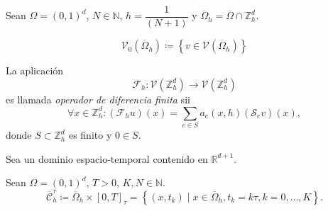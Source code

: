 \begin{definition}
	Sean
	\begin{math}
		\Omega=
		{\left(0,1\right)}^{d}
	\end{math},
	\begin{math}
		N\in\mathbb{N}
	\end{math},
	\begin{math}
		h=
		\dfrac{1}{\left(N+1\right)}
	\end{math}
	y
	\begin{math}
		\overline{\Omega}_{h}=
		\overline{\Omega}\cap
		\mathbb{Z}^{d}_{h}
	\end{math}.

	\begin{equation*}
		\mathcal{V}_{0}\left(\overline{\Omega}_{h}\right)\coloneqq
		\left\{
		v\in\mathcal{V}\left(\overline{\Omega}_{h}\right)
		\right\}
	\end{equation*}
\end{definition}

\begin{definition}
	La aplicación
	\begin{equation*}
		\mathcal{F}_{h}\colon
		\mathcal{V}\left(\mathbb{Z}^{d}_{h}\right)\to
		\mathcal{V}\left(\mathbb{Z}^{d}_{h}\right)
	\end{equation*}
	es llamada \emph{operador de diferencia finita} sii
	\begin{equation*}
		\forall x\in\mathbb{Z}^{d}_{h}:
		\left(\mathcal{F}_{h}u\right)\left(x\right)=
		\sum_{e\in S}
		a_{e}\left(x,h\right)
		\left(\mathcal{S}_{e}v\right)
		\left(x\right),
	\end{equation*}
	donde $S\subset\mathbb{Z}^{d}_{h}$ es finito y $0\in S$.
\end{definition}

Sea un dominio espacio-temporal contenido en $\mathbb{R}^{d+1}$.

\begin{definition}
	Sean
	\begin{math}
		\Omega=
		{\left(0,1\right)}^{d}
	\end{math},
	$T>0$, $K,N\in\mathbb{N}$.
	\begin{equation*}
		\overline{\mathcal{C}}^{\tau}_{h}\coloneqq
		\overline{\Omega}_{h}
		\times
		{\left[0,T\right]}_{\tau}=
		\left\{
		\left(x,t_{k}\right)\mid
		x\in\overline{\Omega}_{h},
		t_{k}=k\tau,
		k=0,\dotsc, K
		\right\}.
	\end{equation*}
\end{definition}

